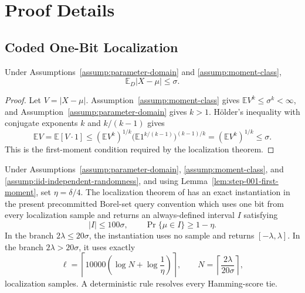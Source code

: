 \appendix

\section{Proof Details}\label{sec:proof-details}

\subsection{Coded One-Bit Localization}\label{app:step-001}

\begin{lemma}\label{lem:step-001-first-moment}
Under Assumptions~\ref{assump:parameter-domain} and \ref{assump:moment-class},
\[
\mathbb E_D|X-\mu|\leq\sigma.
\]
\end{lemma}

\begin{proof}
Let \(V=|X-\mu|\). Assumption~\ref{assump:moment-class} gives \(\mathbb EV^k\leq\sigma^k<\infty\), and Assumption~\ref{assump:parameter-domain} gives \(k>1\). H\"older's inequality with conjugate exponents \(k\) and \(k/(k-1)\) gives
\[
\mathbb EV
=\mathbb E[V\cdot1]
\leq(\mathbb EV^k)^{1/k}
       \bigl(\mathbb E1^{k/(k-1)}\bigr)^{(k-1)/k}
=(\mathbb EV^k)^{1/k}
\leq\sigma.
\]
This is the first-moment condition required by the localization theorem.
\end{proof}

\begin{proposition}\label{prop:step-001-source-localization}
Under Assumptions~\ref{assump:parameter-domain}, \ref{assump:moment-class}, and \ref{assump:iid-independent-randomness}, and using Lemma~\ref{lem:step-001-first-moment}, set \(\eta=\delta/4\). The localization theorem of \citet[Theorem~16 and its localization appendix]{lau2026orderoptimal} has an exact instantiation in the present precommitted Borel-set query convention which uses one bit from every localization sample and returns an always-defined interval \(I\) satisfying
\[
|I|\leq100\sigma,
\qquad
\Pr\{\mu\in I\}\geq1-\eta.
\]
In the branch \(2\lambda\leq20\sigma\), the instantiation uses no sample and returns \([-\lambda,\lambda]\). In the branch \(2\lambda>20\sigma\), it uses exactly
\[
\ell=\left\lceil10000\left(\log N+\log\frac1\eta\right)\right\rceil,
\qquad
N=\left\lceil\frac{2\lambda}{20\sigma}\right\rceil,
\]
localization samples. A deterministic rule resolves every Hamming-score tie.
\end{proposition}

